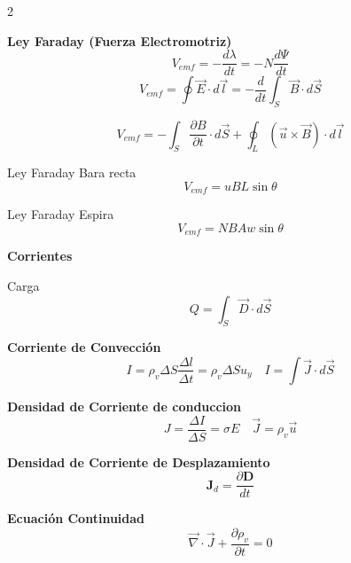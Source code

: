 \documentclass{article}
\begin{document}
\begin{multicols}{2}
\begin{itemform}
\item \textbf{Ley Faraday (Fuerza Electromotriz)}
$$
V_{emf}=-\dfrac{d\lambda}{dt}=-N \dfrac{d\Psi}{dt}
$$
$$
V_{emf}= \oint\vec{E} \cdot d\vec{l}= -\dfrac{d}{dt} \int_S \vec{B} \cdot d\vec{S}
$$

$$
V_{emf}= - \int_S \dfrac{\partial B }{\partial t}\cdot d\vec{S} +\oint_L (\vec{u} \times \vec{B}) \cdot d\vec{l}
$$

\item  Ley Faraday Bara recta
$$
V_{emf}=uBL \sin \theta
$$
\item Ley Faraday Espira
$$
V_{emf}=NBAw \sin \theta
$$

\end{itemform}
\textbf{Corrientes}
\begin{itemform}
    \item Carga 
    $$Q=\int_S \vec{D} \cdot d\vec{S}$$
    \item \textbf{Corriente de Convección}
    $$
    I=\rho_v \Delta S \dfrac{\Delta l}{\Delta t}=\rho_v \Delta S  u_y \quad I=\int \vec{J} \cdot d\vec{S}
    $$
    \item \textbf{Densidad de Corriente de conduccion}
    $$J=\dfrac{\Delta I}{\Delta S}=\sigma E \quad \vec{J}=\rho_v \vec{u}$$
    \item \textbf{Densidad de Corriente de Desplazamiento}
    $$\textbf{J}_d=\dfrac{\partial \textbf{D}}{dt}$$
    \item \textbf{Ecuación Continuidad}
$$
\vec{\nabla} \cdot \vec{J}+\dfrac{\partial\rho_v}{\partial t}=0
$$

\end{itemform}
\end{multicols}

\newpage
\end{document}
